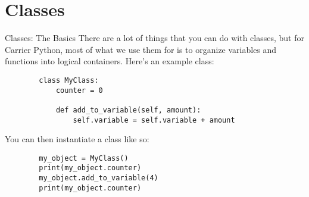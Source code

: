 \documentclass{acm}
\begin{document}
\section{Classes}

\begin{frame}[fragile]{Classes: The Basics}
    There are a lot of things that you can do with classes, but for Carrier
    Python, most of what we use them for is to organize variables and functions
    into logical containers. Here's an example class:

    \begin{verbatim}
        class MyClass:
            counter = 0

            def add_to_variable(self, amount):
                self.variable = self.variable + amount
    \end{verbatim}

    You can then instantiate a class like so:
    \begin{verbatim}
        my_object = MyClass()
        print(my_object.counter)
        my_object.add_to_variable(4)
        print(my_object.counter)
    \end{verbatim}
\end{frame}

\end{document}
